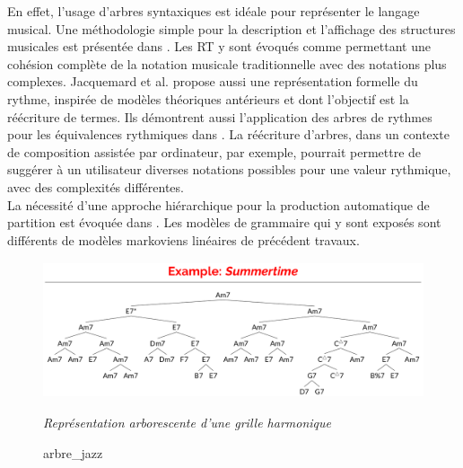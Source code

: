 En effet, l’usage d’arbres syntaxiques est idéale pour représenter le langage musical. Une méthodologie simple pour la description et l'affichage des structures musicales est présentée dans \cite{rythm_tree}. Les RT y sont évoqués comme permettant une cohésion complète de la notation musicale traditionnelle avec des notations plus complexes. Jacquemard et al.\cite{jacquemard:hal-01134096} propose aussi une représentation formelle du rythme, inspirée de modèles théoriques antérieurs et dont l’objectif est la réécriture de termes. Ils démontrent aussi l’application des arbres de rythmes pour les équivalences rythmiques dans \cite{jacquemard:hal-01403982}. La réécriture d’arbres, dans un contexte de composition assistée par ordinateur, par exemple, pourrait permettre de suggérer à un utilisateur diverses notations possibles pour une valeur rythmique, avec des complexités différentes.\\La nécessité d’une approche hiérarchique pour la production automatique de partition est évoquée dans \cite{foscarin:hal-01988990}. Les modèles de grammaire qui y sont exposés sont différents de modèles markoviens linéaires de précédent travaux.\newpage
\begin{figure}[h]
	\centering
	\includegraphics[height=40mm, width=120mm]{z_images/2_etat_de_l_art/summertime_tree.png}
	\caption{arbre\_jazz}
	\textit{Représentation arborescente d’une grille harmonique}\cite{harasimjazz}
\end{figure}
